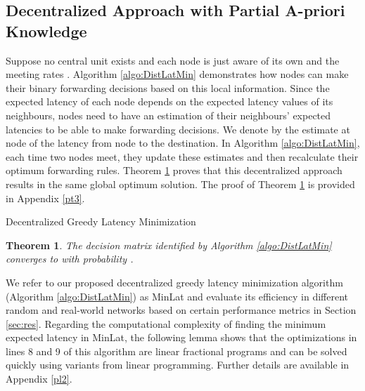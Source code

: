 \documentclass[journal,onecolumn,11pt]{IEEEtran}
\theoremstyle{plain}
\newtheorem{theorem}{Theorem}
\theoremstyle{definition}
\begin{document}
\subsection{Decentralized Approach with Partial A-priori Knowledge}\label{dec_partial}
Suppose no central unit exists and each node is just aware of its own
 and the meeting rates . Algorithm \ref{algo:DistLatMin} demonstrates how nodes
can make their binary forwarding decisions based on this local
information. Since the expected latency of each node depends on the
expected latency values of its neighbours, nodes need to have an
estimation of their neighbours' expected latencies to be able to make
forwarding decisions. We denote by  the estimate
at node  of the latency from node  to the destination. In
Algorithm \ref{algo:DistLatMin}, each time two nodes meet, they update
these estimates and then recalculate their optimum forwarding rules. Theorem
\ref{theorem3} proves that this decentralized approach results in the
same global optimum solution. The proof of Theorem \ref{theorem3} is provided in Appendix \ref{pt3}.
\begin{algorithm}[!htb]
\caption{Decentralized Greedy Latency Minimization} \label{algo:DistLatMin}
\begin{spacing}{1.0}
\begin{algorithmic}[1]
		\vspace{3mm}
		\STATE{}
		\STATE{,  }
			\vspace{0.2cm}
		\ENDWHILE
\end{algorithmic}
\end{spacing}
\end{algorithm}

\begin{theorem}\label{theorem3}
The decision matrix  identified by Algorithm \ref{algo:DistLatMin} converges to  with probability .
\end{theorem}


We refer to our proposed decentralized greedy latency minimization algorithm (Algorithm \ref{algo:DistLatMin}) as MinLat and evaluate its efficiency in different random and real-world networks based on certain performance metrics in Section \ref{sec:res}. Regarding the computational complexity of finding the minimum expected latency in MinLat, the following lemma shows that the optimizations in lines 8 and 9 of this algorithm are linear fractional programs and can be solved quickly using variants from linear programming. Further details are available in Appendix \ref{pl2}. 
\end{document}
